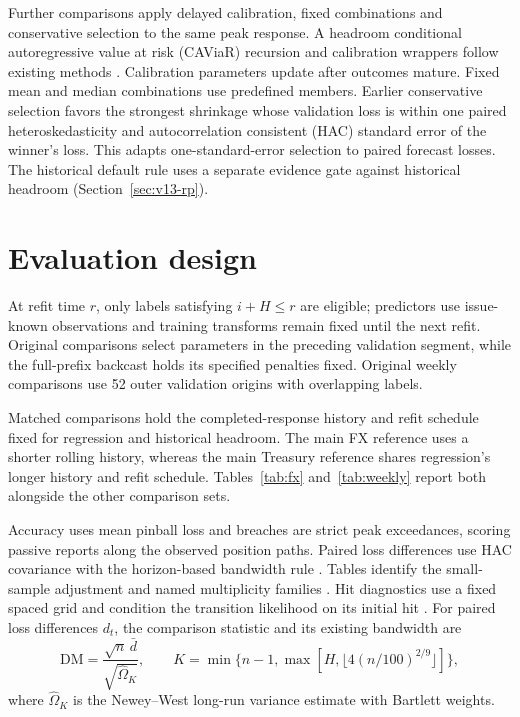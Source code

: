 \documentclass[12pt,a4paper]{article}
\begin{document}
Further comparisons apply delayed calibration, fixed combinations and conservative selection to the same peak response. A headroom conditional autoregressive value at risk (CAViaR) recursion and calibration wrappers follow existing methods \cite{engle2004,gibbs2021}. Calibration parameters update after outcomes mature. Fixed mean and median combinations use predefined members. Earlier conservative selection favors the strongest shrinkage whose validation loss is within one paired heteroskedasticity and autocorrelation consistent (HAC) standard error of the winner's loss. This adapts one-standard-error selection \cite{hastie2009} to paired forecast losses. The historical default rule uses a separate evidence gate against historical headroom (Section~\ref{sec:v13-rp}).



\FloatBarrier

\section{Evaluation design}\label{sec:evaluation}

At refit time \(r\), only labels satisfying \(i+H\le r\) are eligible; predictors use issue-known observations and training transforms remain fixed until the next refit. Original comparisons select parameters in the preceding validation segment, while the full-prefix backcast holds its specified penalties fixed. Original weekly comparisons use 52 outer validation origins with overlapping labels.

Matched comparisons hold the completed-response history and refit schedule fixed for regression and historical headroom. The main FX reference uses a shorter rolling history, whereas the main Treasury reference shares regression's longer history and refit schedule. Tables~\ref{tab:fx} and~\ref{tab:weekly} report both alongside the other comparison sets.

Accuracy uses mean pinball loss and breaches are strict peak exceedances, scoring passive reports along the observed position paths. Paired loss differences use HAC covariance with the horizon-based bandwidth rule \cite{dm1995,nw1987}. Tables identify the small-sample adjustment and named multiplicity families \cite{hln1997,holm1979}. Hit diagnostics use a fixed spaced grid and condition the transition likelihood on its initial hit \cite{kupiec1995,christ1998}.
For paired loss differences \(d_t\), the comparison statistic and its existing bandwidth are
\[
\mathrm{DM}=\frac{\sqrt n\,\bar d}{\sqrt{\widehat\Omega_K}},\qquad
K=\min\{n-1,\max[H,\lfloor4(n/100)^{2/9}\rfloor]\},
\]
where \(\widehat\Omega_K\) is the Newey--West long-run variance estimate with Bartlett weights.
\end{document}

